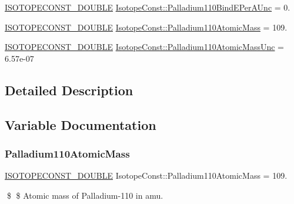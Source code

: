 \begin{DoxyCompactItemize}
\mbox{\hyperlink{group___isotope_const-_macros_ga8f45a7272ce02c0b4c65c44636ed719a}{I\+S\+O\+T\+O\+P\+E\+C\+O\+N\+S\+T\+\_\+\+D\+O\+U\+B\+LE}} \mbox{\hyperlink{group___isotope_const-_palladium-_pd110_ga6b391b7fdf4f0b571ab87758a000094d}{Isotope\+Const\+::\+Palladium110\+Bind\+E\+Per\+A\+Unc}} = 0.
\item 
\mbox{\hyperlink{group___isotope_const-_macros_ga8f45a7272ce02c0b4c65c44636ed719a}{I\+S\+O\+T\+O\+P\+E\+C\+O\+N\+S\+T\+\_\+\+D\+O\+U\+B\+LE}} \mbox{\hyperlink{group___isotope_const-_palladium-_pd110_ga0f3044e8485a6845e6abe6317fa78eea}{Isotope\+Const\+::\+Palladium110\+Atomic\+Mass}} = 109.
\item 
\mbox{\hyperlink{group___isotope_const-_macros_ga8f45a7272ce02c0b4c65c44636ed719a}{I\+S\+O\+T\+O\+P\+E\+C\+O\+N\+S\+T\+\_\+\+D\+O\+U\+B\+LE}} \mbox{\hyperlink{group___isotope_const-_palladium-_pd110_gade9dec86eb1be7d8fa3b5bebcde4df83}{Isotope\+Const\+::\+Palladium110\+Atomic\+Mass\+Unc}} = 6.\+57e-\/07
\end{DoxyCompactItemize}


\subsection{Detailed Description}


\subsection{Variable Documentation}
\mbox{\label{group___isotope_const-_palladium-_pd110_ga0f3044e8485a6845e6abe6317fa78eea}} 
\subsubsection{\texorpdfstring{Palladium110\+Atomic\+Mass}{Palladium110AtomicMass}}
{\footnotesize\ttfamily \mbox{\hyperlink{group___isotope_const-_macros_ga8f45a7272ce02c0b4c65c44636ed719a}{I\+S\+O\+T\+O\+P\+E\+C\+O\+N\+S\+T\+\_\+\+D\+O\+U\+B\+LE}} Isotope\+Const\+::\+Palladium110\+Atomic\+Mass = 109.}

\$ \$ Atomic mass of Palladium-\/110 in amu. \mbox{\label{group___isotope_const-_palladium-_pd110_gade9dec86eb1be7d8fa3b5bebcde4df83}} 
